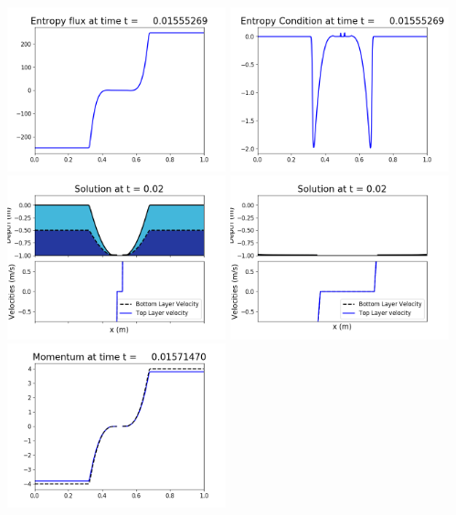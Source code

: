 \documentclass[11pt]{article}
\begin{document}
\includegraphics[width=0.475\textwidth]{frame0097fig1008.png}
\vskip 10pt 
\includegraphics[width=0.475\textwidth]{frame0097fig1009.png}
\vskip 10pt 
\includegraphics[width=0.475\textwidth]{frame0098fig1001.png}
\includegraphics[width=0.475\textwidth]{frame0098fig1002.png}
\vskip 10pt 
\includegraphics[width=0.475\textwidth]{frame0098fig1003.png}
\end{document}
